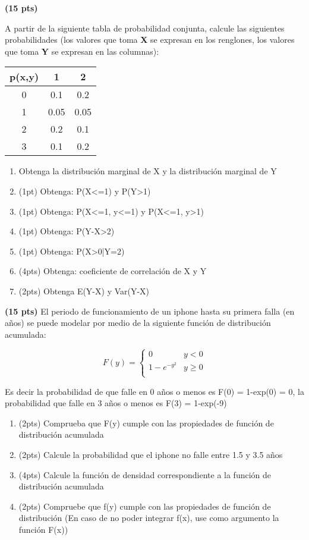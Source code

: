 \documentclass[addpoints]{exam}
\theoremstyle{mytheor}
\begin{document}
\begin{questions}
\question \textbf{(15 pts)}

A partir de la siguiente tabla de probabilidad conjunta, calcule las siguientes probabilidades (los valores que toma \textbf{X} se expresan en los renglones, los valores que toma \textbf{Y} se expresan en las columnas):

\begin{center}
\begin{tabular}{ |c|c|c| } 
\hline
p(x,y) & 1 & 2 \\
\hline
0 & 0.1 & 0.2 \\
1 & 0.05 & 0.05 \\
2 & 0.2 & 0.1 \\
3 & 0.1 & 0.2  \\
\hline
\end{tabular}
\end{center}

\begin{enumerate}[label=\Alph*)]
\item Obtenga la distribución marginal de X y la distribución marginal de Y
\item (1pt) Obtenga: P(X<=1) y P(Y>1)
\item (1pt) Obtenga: P(X<=1, y<=1) y P(X<=1, y>1)
\item (1pt) Obtenga: P(Y-X>2)
\item (1pt) Obtenga: P(X>0|Y=2)
\item (4pts) Obtenga: coeficiente de correlación de X y Y
\item (2pts) Obtenga E(Y-X) y Var(Y-X)
\end{enumerate}


\question \textbf{(15 pts)}
El periodo de funcionamiento de un iphone hasta su primera falla (en años) se puede modelar por medio de la siguiente función de distribución acumulada:

\[   
F(y) = 
     \begin{cases}
       0 & y<0\\
      1-e^{-y^2} & y \geq 0 \\
     \end{cases}
\]

Es decir la probabilidad de que falle en 0 años o menos es F(0) = 1-exp(0) = 0, la probabilidad que falle en 3 años o menos es F(3) = 1-exp(-9)

\begin{enumerate}[label=\Alph*)]
\item (2pts) Comprueba que F(y) cumple con las propiedades de función de distribución acumulada
\item (2pts) Calcule la probabilidad que el iphone no falle entre 1.5 y 3.5 años
\item (4pts) Calcule la función de densidad correspondiente a la función de distribución acumulada
\item (2pts) Compruebe que f(y) cumple con las propiedades de función de distribución (En caso de no poder integrar f(x), use como argumento la función F(x))
\end{enumerate}


\end{questions} 
\end{document}
